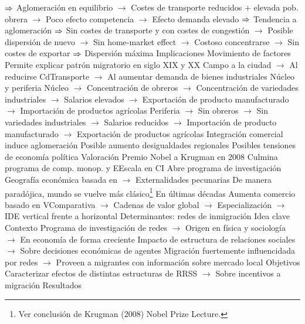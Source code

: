 \documentclass{nuevotema}
\begin{document}
\begin{esquemal}
				\4[] $\Rightarrow$ 
				\4[] Aglomeración en equilibrio
				\4[] $\to$ Costes de transporte reducidos + elevada pob. obrera
				\4[] $\to$ Poco efecto competencia
				\4[] $\to$ Efecto demanda elevado
				\4[] $\Rightarrow$ Tendencia a aglomeración
				\4[] $\Rightarrow$ 
				\4[] Sin costes de transporte y con costes de congestión
				\4[] $\to$ Posible dispersión de nuevo
				\4[] $\to$ Sin home-market effect
				\4[] $\to$ Costoso concentrarse
				\4[] $\to$ Sin costes de exportar
				\4[] $\Rightarrow$ Dispersión máxima
			\3 Implicaciones
				\4 Movimiento de factores
				\4[] Permite explicar patrón migratorio en siglo XIX y XX
				\4[] Campo a la ciudad
				\4[] $\to$ Al reducirse CdTransporte
				\4[] $\to$ Al aumentar demanda de bienes industriales
				\4 Núcleo y periferia
				\4[] Núcleo
				\4[] $\to$ Concentración de obreros
				\4[] $\to$ Concentración de variedades industriales
				\4[] $\to$ Salarios elevados
				\4[] $\to$ Exportación de producto manufacturado
				\4[] $\to$ Importación de productos agrícolas
				\4[] Periferia
				\4[] $\to$ Sin obreros
				\4[] $\to$ Sin variedades industriales
				\4[] $\to$ Salarios reducidos
				\4[] $\to$ Importación de producto manufacturado
				\4[] $\to$ Exportación de productos agrícolas
				\4 Integración comercial induce aglomeración
				\4[] Posible aumento desigualdades regionales
				\4[] Posibles tensiones de economía política
			\3 Valoración
				\4 Premio Nobel a Krugman en 2008
				\4[] Culmina programa de comp. monop. y EEscala en CI
				\4 Abre programa de investigación
				\4[] Geografía económica basada en
				\4[] $\to$ Externalidades pecunarias
				\4 De manera paradójica, mundo se vuelve más clásico\footnote{Ver conclusión de Krugman (2008) Nobel Prize Lecture.}
				\4[] En últimas décadas
				\4[] Aumenta comercio basado en VComparativa
				\4[] $\to$ Cadenas de valor global
				\4[] $\to$ Especialización
				\4[] $\to$ IDE vertical frente a horizontal
		\2 Determinantes: redes de inmigración
			\3 Idea clave
				\4 Contexto
				\4[] Programa de investigación de redes
				\4[] $\to$ Origen en física y sociología
				\4[] $\to$ En economía de forma creciente
				\4[] Impacto de estructura de relaciones sociales
				\4[] $\to$ Sobre decisiones económicas de agentes
				\4[] Migración fuertemente influencidada por redes
				\4[] $\to$ Proveen a migrantes con información sobre mercado local
				\4 Objetivos
				\4[] Caracterizar efectos de distintas estructuras de RRSS
				\4[] $\to$ Sobre incentivos a migración
				\4[]
				\4 Resultados

\end{esquemal}
\end{document}
